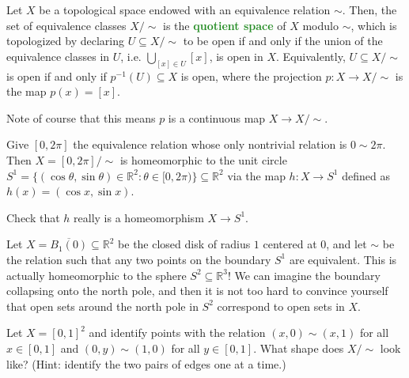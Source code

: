 \documentclass[11pt]{scrartcl}
\providecommand{\ol}{\overline}
\providecommand{\RR}{\mathbb R}
\providecommand{\inv}{^{-1}}
\providecommand{\vocab}[1]{{\textbf{\textcolor{ForestGreen}{#1}}}}
\begin{document}
\begin{definition}
    \label{def:quotient-top}
    Let $X$ be a topological space endowed with an equivalence relation $\sim$.
    Then, the set of equivalence classes $X/{\sim}$ is the
    \vocab{quotient space} of $X$ modulo $\sim$,
    which is topologized by declaring $U\subseteq X/{\sim}$ to be open
    if and only if the union of the equivalence classes in $U$,
    i.e. $\bigcup_{[x]\in U} [x]$, is open in $X$.
    Equivalently, $U\subseteq X/{\sim}$ is open if and only if
    $p\inv(U)\subseteq X$ is open, where the projection $p\colon X\to X/{\sim}$
    is the map $p(x) = [x]$.
\end{definition}
Note of course that this means $p$ is a continuous map $X\to X/{\sim}$.

\begin{example}
    Give $[0,2\pi]$ the equivalence relation
    whose only nontrivial relation is $0\sim 2\pi$.
    Then $X=[0,2\pi]/{\sim}$ is homeomorphic to the unit circle
    $S^1 = \{(\cos\theta,\sin\theta) \in\RR^2 : \theta\in[0,2\pi)\}\subseteq\RR^2$
    via the map $h\colon X\to S^1$ defined as $h(x) = (\cos x,\sin x)$.
\end{example}

\begin{exercise}
    Check that $h$ really is a homeomorphism $X\to S^1$.
\end{exercise}

\begin{example}
    Let $X = \ol{B_1(0)}\subseteq\RR^2$ be the closed disk of radius $1$
    centered at $0$, and let $\sim$ be the relation such that
    any two points on the boundary $S^1$ are equivalent.
    This is actually homeomorphic to the sphere $S^2\subseteq\RR^3$!
    We can imagine the boundary collapsing onto the north pole,
    and then it is not too hard to convince yourself
    that open sets around the north pole in $S^2$ correspond to
    open sets in $X$.
\end{example}

\begin{exercise}
    Let $X = [0,1]^2$ and identify points with the relation
    $(x,0)\sim(x,1)$ for all $x\in[0,1]$ and $(0,y)\sim(1,0)$
    for all $y\in[0,1]$. What shape does $X/{\sim}$ look like?
    (Hint: identify the two pairs of edges one at a time.)
\end{exercise}
\end{document}
